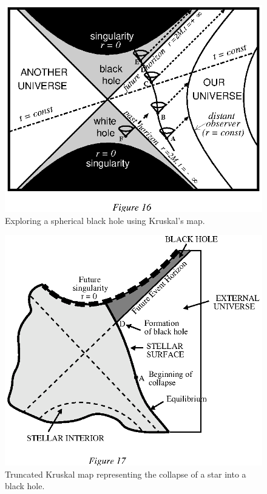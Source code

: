 \documentclass{lamuphys}
\begin{document}
\begin{figure}[tb]
  \begin{center}
    \leavevmode
    \includegraphics{kruskal.ps}    
    \caption{Exploring a spherical black hole using Kruskal's map.}
  \end{center}
\end{figure}
\begin{figure}[tb]
  \begin{center}
    \leavevmode
    \includegraphics{kruskalB.ps}    
    \caption{Truncated Kruskal map representing the collapse of a star
      into a black hole.}
  \end{center}
\end{figure}
\end{document}
